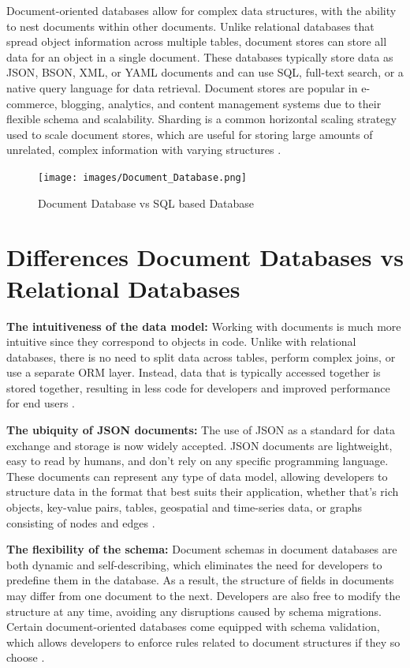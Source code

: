 Document-oriented databases allow for complex data structures, with the ability to nest documents within other documents. Unlike relational databases that spread object information across multiple tables, document stores can store all data for an object in a single document. These databases typically store data as \ac{JSON}, \ac{BSON}, \ac{XML}, or \ac{YAML} documents and can use \ac{SQL}, full-text search, or a native query language for data retrieval. Document stores are popular in e-commerce, blogging, analytics, and content management systems due to their flexible schema and scalability. Sharding is a common horizontal scaling strategy used to scale document stores, which are useful for storing large amounts of unrelated, complex information with varying structures \parencite{mongodb-Comparison}.

\begin{figure}[H]
    \centering
    \caption[Document Database vs SQL based Database]{Document Database vs SQL based Database \parencite{mogngodb-image}} \label{fig:Software pricing Overview}
    \texttt{[image: images/Document\_Database.png]}
\end{figure}

\section{Differences Document Databases vs Relational Databases}

\textbf{The intuitiveness of the data model:} Working with documents is much more intuitive since they correspond to objects in code. Unlike with relational databases, there is no need to split data across tables, perform complex joins, or use a separate \ac{ORM} layer. Instead, data that is typically accessed together is stored together, resulting in less code for developers and improved performance for end users \parencite{mongodb-mongo}.

\textbf{The ubiquity of JSON documents:} The use of \ac{JSON} as a standard for data exchange and storage is now widely accepted. \ac{JSON} documents are lightweight, easy to read by humans, and don't rely on any specific programming language. These documents can represent any type of data model, allowing developers to structure data in the format that best suits their application, whether that's rich objects, key-value pairs, tables, geospatial and time-series data, or graphs consisting of nodes and edges \parencite{mongodb-mongo}.

\textbf{The flexibility of the schema:} Document schemas in document databases are both dynamic and self-describing, which eliminates the need for developers to predefine them in the database. As a result, the structure of fields in documents may differ from one document to the next. Developers are also free to modify the structure at any time, avoiding any disruptions caused by schema migrations. Certain document-oriented databases come equipped with schema validation, which allows developers to enforce rules related to document structures if they so choose \parencite{mongodb-mongo}.

